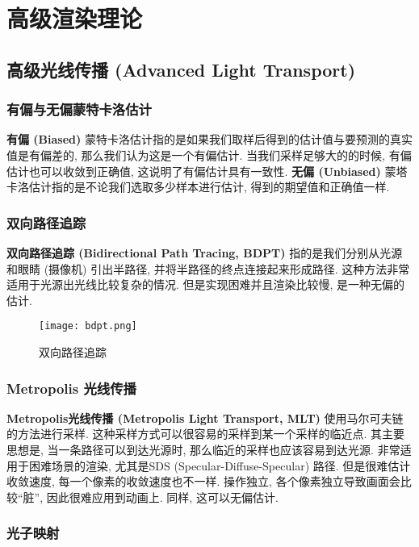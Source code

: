 \chapter{高级渲染理论}

\section{高级光线传播 (Advanced Light Transport) }

\subsection{有偏与无偏蒙特卡洛估计}

\textbf{有偏 (Biased) }蒙特卡洛估计指的是如果我们取样后得到的估计值与要预测的真实值是有偏差的, 那么我们认为这是一个有偏估计. 当我们采样足够大的的时候, 有偏估计也可以收敛到正确值, 这说明了有偏估计具有一致性. \textbf{无偏 (Unbiased) }蒙塔卡洛估计指的是不论我们选取多少样本进行估计, 得到的期望值和正确值一样. 

\subsection{双向路径追踪}

\textbf{双向路径追踪 (Bidirectional Path Tracing, BDPT) }指的是我们分别从光源和眼睛 (摄像机) 引出半路径, 并将半路径的终点连接起来形成路径. 这种方法非常适用于光源出光线比较复杂的情况. 但是实现困难并且渲染比较慢, 是一种无偏的估计. 

\begin{figure}[H]
	\centering
	\texttt{[image: bdpt.png]}
	\caption{双向路径追踪}
	\label{fig:bdpt}
\end{figure}

\subsection{Metropolis 光线传播}

\textbf{Metropolis光线传播 (Metropolis Light Transport, MLT) }使用马尔可夫链的方法进行采样. 这种采样方式可以很容易的采样到某一个采样的临近点. 其主要思想是, 当一条路径可以到达光源时, 那么临近的采样也应该容易到达光源. 非常适用于困难场景的渲染, 尤其是SDS (Specular-Diffuse-Specular) 路径. 但是很难估计收敛速度, 每一个像素的收敛速度也不一样. 操作独立, 各个像素独立导致画面会比较``脏”, 因此很难应用到动画上. 同样, 这可以无偏估计. 

\subsection{光子映射}

